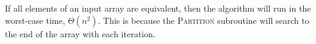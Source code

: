 If all elements of an input array are equivalent, then the algorithm will run in the worst-case time, $ \Theta(n^2) $. This is because the \textsc{Partition} subroutine will search to the end of the array with each iteration.